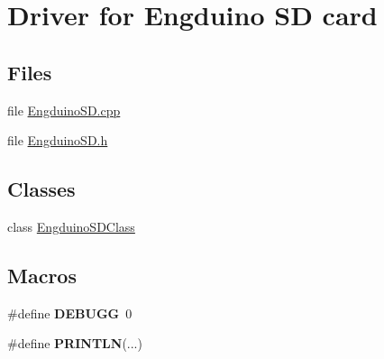 \hypertarget{group___engduino_s_d}{}\section{Driver for Engduino S\+D card}
\label{group___engduino_s_d}
\subsection*{Files}
\begin{DoxyCompactItemize}
\item 
file \hyperlink{_engduino_s_d_8cpp}{Engduino\+S\+D.\+cpp}
\item 
file \hyperlink{_engduino_s_d_8h}{Engduino\+S\+D.\+h}
\end{DoxyCompactItemize}
\subsection*{Classes}
\begin{DoxyCompactItemize}
\item 
class \hyperlink{class_engduino_s_d_class}{Engduino\+S\+D\+Class}
\end{DoxyCompactItemize}
\subsection*{Macros}
\begin{DoxyCompactItemize}
\item 
\hypertarget{group___engduino_s_d_ga30d9b8759178d9c4b1fa253aa97f11a0}{}\#define {\bfseries D\+E\+B\+U\+G\+G}~0\label{group___engduino_s_d_ga30d9b8759178d9c4b1fa253aa97f11a0}

\item 
\hypertarget{group___engduino_s_d_ga1f9db1dc616fc2004e22f9f442bb212b}{}\#define {\bfseries P\+R\+I\+N\+T\+L\+N}(...)\label{group___engduino_s_d_ga1f9db1dc616fc2004e22f9f442bb212b}

\end{DoxyCompactItemize}
